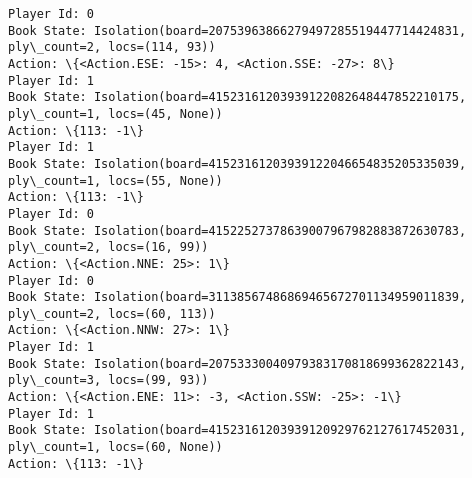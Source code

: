 \documentclass[11pt]{article}
\begin{document}
\begin{Verbatim}[commandchars=\\\{\}]
Player Id: 0
Book State: Isolation(board=20753963866279497285519447714424831, ply\_count=2, locs=(114, 93))
Action: \{<Action.ESE: -15>: 4, <Action.SSE: -27>: 8\}
Player Id: 1
Book State: Isolation(board=41523161203939122082648447852210175, ply\_count=1, locs=(45, None))
Action: \{113: -1\}
Player Id: 1
Book State: Isolation(board=41523161203939122046654835205335039, ply\_count=1, locs=(55, None))
Action: \{113: -1\}
Player Id: 0
Book State: Isolation(board=41522527378639007967982883872630783, ply\_count=2, locs=(16, 99))
Action: \{<Action.NNE: 25>: 1\}
Player Id: 0
Book State: Isolation(board=31138567486869465672701134959011839, ply\_count=2, locs=(60, 113))
Action: \{<Action.NNW: 27>: 1\}
Player Id: 1
Book State: Isolation(board=20753330040979383170818699362822143, ply\_count=3, locs=(99, 93))
Action: \{<Action.ENE: 11>: -3, <Action.SSW: -25>: -1\}
Player Id: 1
Book State: Isolation(board=41523161203939120929762127617452031, ply\_count=1, locs=(60, None))
Action: \{113: -1\}


\end{Verbatim}
\end{document}
